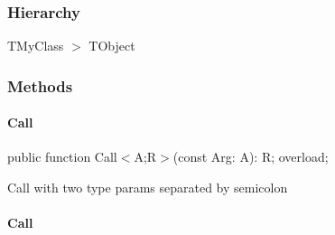 \documentclass{report}
\newif\ifpdf
\begin{document}
\subsubsection*{\large{\textbf{Hierarchy}}\normalsize\hspace{1ex}\hfill}
TMyClass {$>$} TObject
\subsubsection*{\large{\textbf{Methods}}\normalsize\hspace{1ex}\hfill}
\paragraph*{Call}\hspace*{\fill}

\label{ok_generic_multiple_constraints.TMyClass-Call}
\begin{list}{}{
\setlength{\itemindent}{0cm}
\setlength{\listparindent}{0cm}
\setlength{\leftmargin}{\evensidemargin}
\addtolength{\leftmargin}{\tmplength}
\settowidth{\labelsep}{X}
\addtolength{\leftmargin}{\labelsep}
\setlength{\labelwidth}{\tmplength}
}
\item[\textbf{Declaration}\hfill]
\ifpdf
\begin{flushleft}
\fi
\begin{ttfamily}
public function Call{$<$}A;R{$>$}(const Arg: A): R; overload;\end{ttfamily}

\ifpdf
\end{flushleft}
\fi

\par
\item[\textbf{Description}]
Call with two type params separated by semicolon

\end{list}
\paragraph*{Call}\hspace*{\fill}
\end{document}
